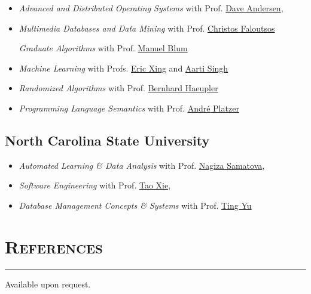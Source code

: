 \documentclass{article}
\newcommand{\HRule}{\rule{\linewidth}{0.5mm}}
\begin{document}
\begin{itemize}
\item \emph{Advanced and Distributed Operating Systems} with Prof. \href{http://www.cs.cmu.edu/~dga}{Dave Andersen},

\item \emph{Multimedia Databases and Data Mining} with Prof. \href{http://www.cs.cmu.edu/~christos}{Christos Faloutsos}

\emph{Graduate Algorithms} with Prof. \href{http://www.cs.cmu.edu/~mblum}{Manuel Blum}

\item \emph{Machine Learning} with Profs. \href{http://www.cs.cmu.edu/~epxing}{Eric Xing} and \href{http://www.cs.cmu.edu/~aarti}{Aarti Singh}

\item \emph{Randomized Algorithms} with Prof. \href{http://www.cs.cmu.edu/~haeupler}{Bernhard Haeupler}

\item \emph{Programming Language Semantics} with Prof. \href{http://www.cs.cmu.edu/~aplatzer}{Andr{\'e} Platzer}
\end{itemize}


\subsection*{\bf {North Carolina State University}}

\begin{itemize}
\item \emph{Automated Learning \& Data Analysis} with Prof. \href{http://www.csc.ncsu.edu/people/nfsamato}{Nagiza Samatova}, 
 
\item \emph{Software Engineering} with Prof. \href{http://web.engr.illinois.edu/~taoxie}{Tao Xie}, 

\item \emph{Database Management Concepts \& Systems} with Prof. \href{http://www.csc.ncsu.edu/people/tyu}{Ting Yu}
\end{itemize}


\section*{\bf \textsc{References}}
\vspace{-5mm}\HRule
\vspace{1em}
Available upon request.

\bigskip
\end{document}
